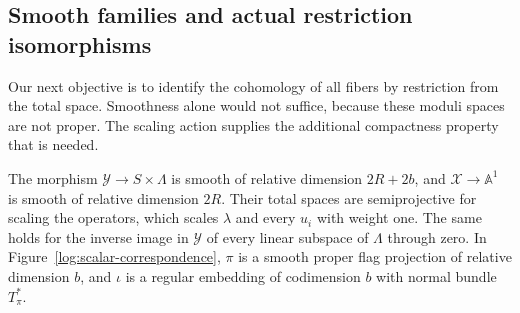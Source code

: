 \subsection{Smooth families and actual restriction isomorphisms}

Our next objective is to identify the cohomology of all fibers by
restriction from the total space.  Smoothness alone would not suffice,
because these moduli spaces are not proper.  The scaling action supplies
the additional compactness property that is needed.

\begin{proposition}
\label{log:families}
The morphism $\mathcal Y\to S\times\Lambda$ is smooth of relative
dimension $2R+2b$, and $\mathcal X\to\mathbb A^1$ is smooth of relative
dimension $2R$.  Their total spaces are semiprojective for scaling the
operators, which scales $\lambda$ and every $u_i$ with weight one.
The same holds for the inverse image in $\mathcal Y$ of every linear
subspace of $\Lambda$ through zero.  In
Figure~\ref{log:scalar-correspondence}, $\pi$ is a smooth proper flag
projection of relative dimension $b$, and $\iota$ is a regular embedding
of codimension $b$ with normal bundle $T_\pi^*$.
\end{proposition}


